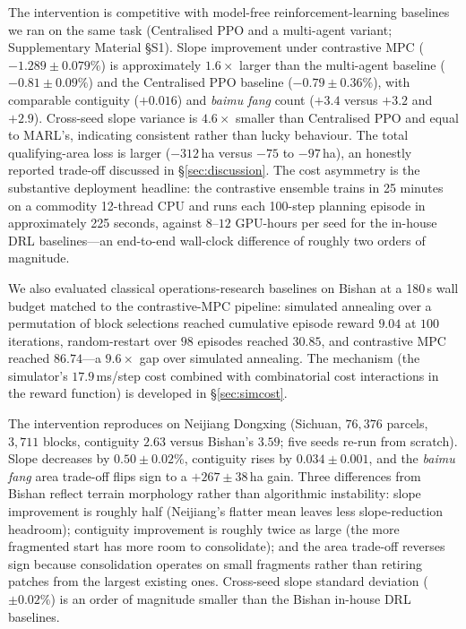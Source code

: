 \documentclass[11pt]{article}
\begin{document}
The intervention is competitive with model-free reinforcement-learning baselines we ran on the same task (Centralised PPO and a multi-agent variant; Supplementary Material \S S1). Slope improvement under contrastive MPC ($-1.289 \pm 0.079\%$) is approximately $1.6\times$ larger than the multi-agent baseline ($-0.81 \pm 0.09\%$) and the Centralised PPO baseline ($-0.79 \pm 0.36\%$), with comparable contiguity ($+0.016$) and \textit{baimu fang} count ($+3.4$ versus $+3.2$ and $+2.9$). Cross-seed slope variance is $4.6\times$ smaller than Centralised PPO and equal to MARL's, indicating consistent rather than lucky behaviour. The total qualifying-area loss is larger ($-312$\,ha versus $-75$ to $-97$\,ha), an honestly reported trade-off discussed in \S\ref{sec:discussion}. The cost asymmetry is the substantive deployment headline: the contrastive ensemble trains in 25 minutes on a commodity 12-thread CPU and runs each 100-step planning episode in approximately 225 seconds, against $8$--$12$ GPU-hours per seed for the in-house DRL baselines---an end-to-end wall-clock difference of roughly two orders of magnitude.

We also evaluated classical operations-research baselines on Bishan at a 180\,s wall budget matched to the contrastive-MPC pipeline: simulated annealing over a permutation of block selections reached cumulative episode reward $9.04$ at $100$ iterations, random-restart over $98$ episodes reached $30.85$, and contrastive MPC reached $86.74$---a $9.6\times$ gap over simulated annealing. The mechanism (the simulator's $17.9$\,ms/step cost combined with combinatorial cost interactions in the reward function) is developed in \S\ref{sec:simcost}.

The intervention reproduces on Neijiang Dongxing (Sichuan, $76{,}376$ parcels, $3{,}711$ blocks, contiguity $2.63$ versus Bishan's $3.59$; five seeds re-run from scratch). Slope decreases by $0.50 \pm 0.02\%$, contiguity rises by $0.034 \pm 0.001$, and the \textit{baimu fang} area trade-off flips sign to a $+267 \pm 38$\,ha gain. Three differences from Bishan reflect terrain morphology rather than algorithmic instability: slope improvement is roughly half (Neijiang's flatter mean leaves less slope-reduction headroom); contiguity improvement is roughly twice as large (the more fragmented start has more room to consolidate); and the area trade-off reverses sign because consolidation operates on small fragments rather than retiring patches from the largest existing ones. Cross-seed slope standard deviation ($\pm 0.02\%$) is an order of magnitude smaller than the Bishan in-house DRL baselines.
\end{document}
